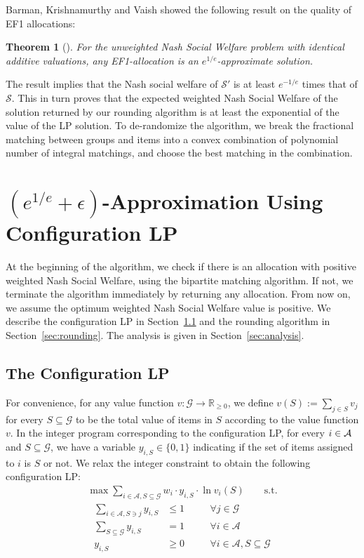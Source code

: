 \documentclass[10pt,a4paper]{article}
\newtheorem{theorem}{Theorem}[section]
\theoremstyle{definition}
\theoremstyle{plain}
\newcommand\calS{{\mathcal{S}}}
\newcommand\calA{{\mathcal{A}}}
\newcommand\calG{{\mathcal{G}}}
\newcommand{\R}{{\mathbb{R}}}
\begin{document}
Barman, Krishnamurthy and Vaish \cite{BKV18} showed the following result on the quality of EF1 allocations:
    \begin{theorem}[\cite{BKV18}]
        \label{thm:EF1}
        For the unweighted Nash Social Welfare problem with identical additive valuations, any EF1-allocation is an $e^{1/e}$-approximate solution. 
    \end{theorem} %

The result implies that the Nash social welfare of $\calS'$ is at least $e^{-1/e}$ times that of $\calS$. This in turn proves that the expected weighted Nash Social Welfare of the solution returned by our rounding algorithm is at least the exponential of the value of the LP solution.  To de-randomize the algorithm, we break the fractional matching between groups and items into a convex combination of polynomial number of integral matchings, and choose the best matching in the combination. 


\section{\texorpdfstring{$(e^{1/e} + \epsilon)$}{e to the 1/e + epsilon}-Approximation Using Configuration LP}
At the beginning of the algorithm, we check if there is an allocation with positive weighted Nash Social Welfare, using the bipartite matching algorithm. If not, we terminate the algorithm immediately by returning any allocation. From now on, we assume the optimum weighted Nash Social Welfare value is positive.  We describe the configuration LP in Section~\ref{sec:LP} and the rounding algorithm in Section~\ref{sec:rounding}. The analysis is given in Section~\ref{sec:analysis}.

\subsection{The Configuration LP} \label{sec:LP}

For convenience, for any value function $v: \calG \to \R_{\geq 0}$, we define $v(S):= \sum_{j \in S}v_j$ for every $S \subseteq \calG$ to be the total value of items in $S$ according to the value function $v$. In the integer program corresponding to the configuration LP, for every $i \in \cal A$ and $S \subseteq \calG$, we have a variable $y_{i, S} \in \{0, 1\}$ indicating if the set of items assigned to $i$ is $S$ or not. We relax the integer constraint to obtain the following configuration LP: 
\begin{align}
    \max \sum_{i \in \calA, S \subseteq  \calG} w_i \cdot y_{i, S} \cdot \ln v_i(S) \qquad \text{s.t.} \tag{Conf-LP}\label{CLP}
\end{align} \vspace*{-10pt}
\begin{align}
    \sum_{i \in \calA, S \ni j} y_{i, S} &\leq 1 &\quad &\forall j \in \calG \label{LPC:j-assigned-once}\\
    \sum_{S \subseteq \calG} y_{i, S} &= 1 &\quad &\forall i \in \calA \label{LPC:i-gets-one-set}\\
    y_{i, S} &\geq 0 &\quad &\forall i \in \calA, S\subseteq \calG
\end{align}
\end{document}
